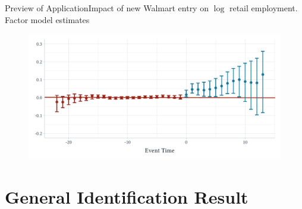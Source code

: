 \documentclass[aspectratio=169,t,11pt]{beamer}
\begin{document}
\begin{frame}{Preview of Application}{Impact of new Walmart entry on $\log$ retail employment. Factor model estimates}
  \vspace{-5mm}
  \begin{figure}
    \begin{adjustbox}{width=0.9\textwidth}
      \includegraphics{../figures/qld_retail.pdf}
    \end{adjustbox}
  \end{figure}
\end{frame}

% 

% 

\section{General Identification Result}
\end{document}
